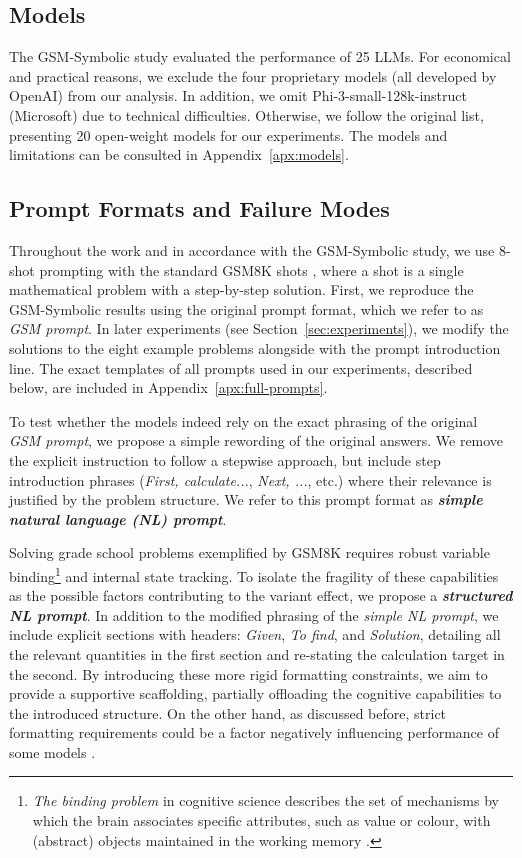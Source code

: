 \documentclass[11pt]{article}
\begin{document}
\subsection{Models}\label{sec:models}
The GSM-Symbolic study evaluated the performance of 25 LLMs. For economical and practical reasons, we exclude the four proprietary models (all developed by OpenAI) from our analysis. In addition, we omit Phi-3-small-128k-instruct (Microsoft) due to technical difficulties. Otherwise, we follow the original list, presenting 20 open-weight models for our experiments. The models and limitations can be consulted in Appendix~\ref{apx:models}.

\subsection{Prompt Formats and Failure Modes}\label{sec:prompt-formats} 
Throughout the work and in accordance with the GSM-Symbolic study, we use 8-shot prompting with the standard GSM8K shots \citep{eval-harness}, where a shot is a single mathematical problem with a step-by-step solution. First, we reproduce the GSM-Symbolic results using the original prompt format, which we refer to as \textit{GSM prompt}. In later experiments (see Section~\ref{sec:experiments}), we modify the solutions to the eight example problems alongside with the prompt introduction line. The exact templates of all prompts used in our experiments, described below, are included in Appendix~\ref{apx:full-prompts}.

To test whether the models indeed rely on the exact phrasing of the original \textit{GSM prompt}, we propose a simple rewording of the original answers. We remove the explicit instruction to follow a stepwise approach, but include step introduction phrases (\textit{First, calculate...}, \textit{Next, ...}, etc.) where their relevance is justified by the problem structure. We refer to this prompt format as \textbf{\textit{simple natural language (NL) prompt}}.

Solving grade school problems exemplified by GSM8K requires robust variable binding\footnote{\textit{The binding problem} in cognitive science describes the set of mechanisms by which the brain associates specific attributes, such as value or colour, with (abstract) objects maintained in the working memory \cite{roskies1999binding}.} and internal state tracking. To isolate the fragility of these capabilities as the possible factors contributing to the variant effect, we propose a \textbf{\textit{structured NL prompt}}. In addition to the modified phrasing of the \textit{simple NL prompt}, we include explicit sections with headers: \textit{Given}, \textit{To find}, and \textit{Solution}, detailing all the relevant quantities in the first section and re-stating the calculation target in the second. By introducing these more rigid formatting constraints, we aim to provide a supportive scaffolding, partially offloading the cognitive capabilities to the introduced structure. On the other hand, as discussed before, strict formatting requirements could be a factor negatively influencing performance of some models \citep{cazares2026morecognitiveloadsingleprompt, mittal2026didforgetiasked}.
\end{document}
